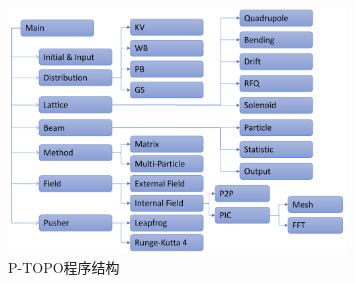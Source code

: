 \begin{figure}[!htb]
    \centering
    \includegraphics[width=0.8\textwidth]{Img/P_TOPO.pdf}
    \caption{P-TOPO程序结构}
    \label{fig:P_TOPO}
\end{figure}

